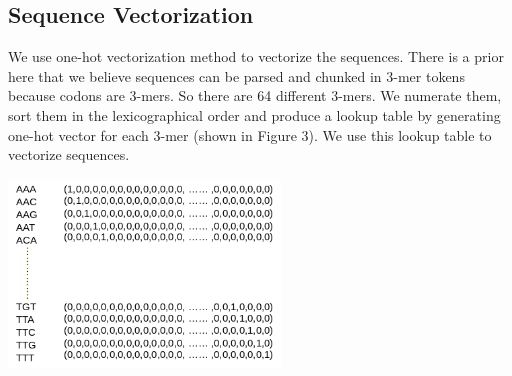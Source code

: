 \documentclass[letterpaper, 11pt]{article}
\newenvironment{Figure}
  {\par\medskip\noindent\minipage{\linewidth}}
  {\endminipage\par\medskip}
\begin{document}
\begin{multicols*}{2}
{\subsection{Sequence Vectorization}
We use one-hot vectorization method to vectorize the sequences. There is a prior here that we believe sequences can be parsed and chunked in 3-mer tokens because codons are 3-mers. So there are 64 different 3-mers. We numerate them, sort them in the lexicographical order and produce a lookup table by generating one-hot vector for each 3-mer (shown in Figure 3). We use this lookup table to vectorize sequences.
\begin{Figure}
\includegraphics[height=5cm, width=\textwidth]{lookup_table.png}
\end{Figure} 
}
\end{multicols*}
\end{document}
